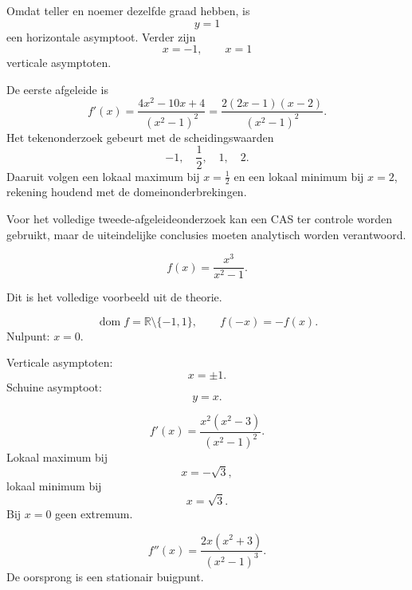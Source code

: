 \documentclass{ximera}
\begin{document}
\begin{oefening}{\oefU\ESS}
\begin{question}
\begin{oplossing}
Omdat teller en noemer dezelfde graad hebben, is
\[
y=1
\]
een horizontale asymptoot. Verder zijn
\[
x=-1,\qquad x=1
\]
verticale asymptoten.

De eerste afgeleide is
\[
f'(x)=\frac{4x^2-10x+4}{(x^2-1)^2}
=
\frac{2(2x-1)(x-2)}{(x^2-1)^2}.
\]
Het tekenonderzoek gebeurt met de scheidingswaarden
\[
-1,\quad \frac12,\quad1,\quad2.
\]
Daaruit volgen een lokaal maximum bij \(x=\frac12\) en een lokaal minimum
bij \(x=2\), rekening houdend met de domeinonderbrekingen.

Voor het volledige tweede-afgeleideonderzoek kan een CAS ter controle
worden gebruikt, maar de uiteindelijke conclusies moeten analytisch
worden verantwoord.
\end{oplossing}
\end{question}

\begin{question}
\[
f(x)=\frac{x^3}{x^2-1}.
\]
\begin{oplossing}
Dit is het volledige voorbeeld uit de theorie.

\[
\operatorname{dom}f=\mathbb{R}\setminus\{-1,1\},
\qquad
f(-x)=-f(x).
\]
Nulpunt: \(x=0\).

Verticale asymptoten:
\[
x=\pm1.
\]
Schuine asymptoot:
\[
y=x.
\]

\[
f'(x)=\frac{x^2(x^2-3)}{(x^2-1)^2}.
\]
Lokaal maximum bij
\[
x=-\sqrt3,
\]
lokaal minimum bij
\[
x=\sqrt3.
\]
Bij \(x=0\) geen extremum.

\[
f''(x)=\frac{2x(x^2+3)}{(x^2-1)^3}.
\]
De oorsprong is een stationair buigpunt.
\end{oplossing}
\end{question}
\end{oefening}
\end{document}
